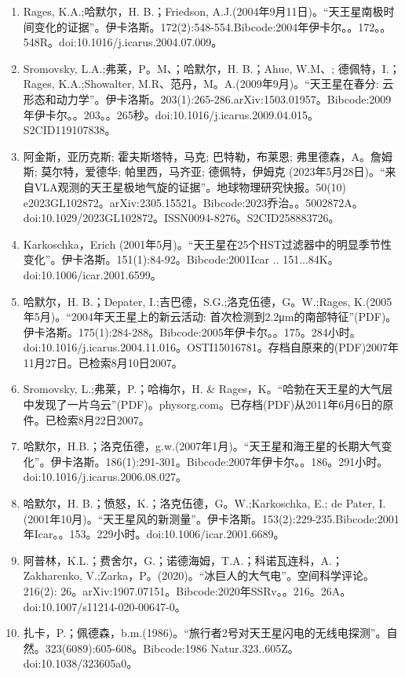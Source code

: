 \begin{enumerate}
\item Rages, K.A.;哈默尔，H. B.；Friedson, A.J.(2004年9月11日)。“天王星南极时间变化的证据”。伊卡洛斯。172(2):548-554.Bibcode:2004年伊卡尔。。172。。548R。doi:10.1016/j.icarus.2004.07.009。
\item Sromovsky, L.A.;弗莱，P。M、；哈默尔，H. B.；Ahue, W.M、; 德佩特，I.；Rages, K.A.;Showalter, M.R、范丹，M。A.(2009年9月)。“天王星在春分: 云形态和动力学”。伊卡洛斯。203(1):265-286.arXiv:1503.01957。Bibcode:2009年伊卡尔。。203。。265秒。doi:10.1016/j.icarus.2009.04.015。S2CID119107838。  
\item 阿金斯，亚历克斯; 霍夫斯塔特，马克; 巴特勒，布莱恩; 弗里德森，A。詹姆斯; 莫尔特，爱德华; 帕里西，马齐亚; 德佩特，伊姆克 (2023年5月28日)。“来自VLA观测的天王星极地气旋的证据”。地球物理研究快报。50(10) e2023GL102872。arXiv:2305.15521。Bibcode:2023乔治。。5002872A。doi:10.1029/2023GL102872。ISSN0094-8276。S2CID258883726。  
\item Karkoschka，Erich (2001年5月)。“天王星在25个HST过滤器中的明显季节性变化”。伊卡洛斯。151(1):84-92。Bibcode:2001Icar .. 151...84K。doi:10.1006/icar.2001.6599。
\item 哈默尔，H. B.；Depater, I.;吉巴德，S.G.;洛克伍德，G。W.;Rages, K.(2005年5月)。“2004年天王星上的新云活动: 首次检测到2.2μm的南部特征”(PDF)。伊卡洛斯。175(1):284-288。Bibcode:2005年伊卡尔。。175。284小时。doi:10.1016/j.icarus.2004.11.016。OSTI15016781。存档自原来的(PDF)2007年11月27日。已检索8月10日2007。  
\item Sromovsky, L.;弗莱，P.；哈梅尔，H. & Rages，K。“哈勃在天王星的大气层中发现了一片乌云”(PDF)。physorg.com。已存档(PDF)从2011年6月6日的原件。已检索8月22日2007。
\item 哈默尔，H.B.；洛克伍德，g.w.(2007年1月)。“天王星和海王星的长期大气变化”。伊卡洛斯。186(1):291-301。Bibcode:2007年伊卡尔。。186。291小时。doi:10.1016/j.icarus.2006.08.027。
\item 哈默尔，H. B.；愤怒，K.；洛克伍德，G。W.;Karkoschka, E.; de Pater, I.(2001年10月)。“天王星风的新测量”。伊卡洛斯。153(2):229-235.Bibcode:2001年Icar。。153。229小时。doi:10.1006/icar.2001.6689。
\item 阿普林，K.L.；费舍尔，G.；诺德海姆，T.A.；科诺瓦连科，A.；Zakharenko, V.;Zarka，P。(2020)。“冰巨人的大气电”。空间科学评论。216(2): 26。arXiv:1907.07151。Bibcode:2020年SSRv。。216。26A。doi:10.1007/s11214-020-00647-0。
\item 扎卡，P.；佩德森，b.m.(1986)。“旅行者2号对天王星闪电的无线电探测”。自然。323(6089):605-608。Bibcode:1986 Natur.323..605Z。doi:10.1038/323605a0。

\end{enumerate}
